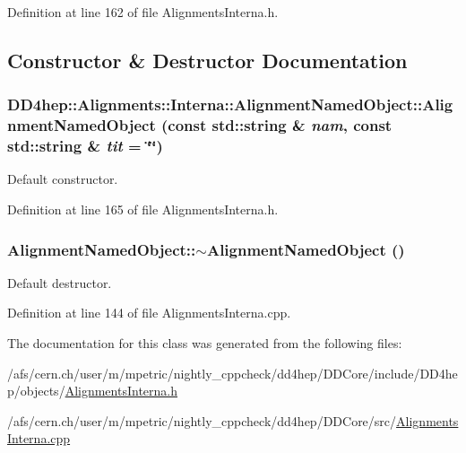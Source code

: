Definition at line 162 of file AlignmentsInterna.h.

\subsection{Constructor \& Destructor Documentation}
\hypertarget{class_d_d4hep_1_1_alignments_1_1_interna_1_1_alignment_named_object_a0446fa258b55e441adae43fd5f1c20e8}{
\subsubsection[{AlignmentNamedObject}]{\setlength{\rightskip}{0pt plus 5cm}DD4hep::Alignments::Interna::AlignmentNamedObject::AlignmentNamedObject (const std::string \& {\em nam}, \/  const std::string \& {\em tit} = {\ttfamily \char`\"{}\char`\"{}})}}
\label{class_d_d4hep_1_1_alignments_1_1_interna_1_1_alignment_named_object_a0446fa258b55e441adae43fd5f1c20e8}


Default constructor. 

Definition at line 165 of file AlignmentsInterna.h.\hypertarget{class_d_d4hep_1_1_alignments_1_1_interna_1_1_alignment_named_object_a96f03450aa9af33962d86b7067473939}{
\subsubsection[{$\sim$AlignmentNamedObject}]{\setlength{\rightskip}{0pt plus 5cm}AlignmentNamedObject::$\sim$AlignmentNamedObject ()}}
\label{class_d_d4hep_1_1_alignments_1_1_interna_1_1_alignment_named_object_a96f03450aa9af33962d86b7067473939}


Default destructor. 

Definition at line 144 of file AlignmentsInterna.cpp.

The documentation for this class was generated from the following files:\begin{DoxyCompactItemize}
\item 
/afs/cern.ch/user/m/mpetric/nightly\_\-cppcheck/dd4hep/DDCore/include/DD4hep/objects/\hyperlink{_alignments_interna_8h}{AlignmentsInterna.h}\item 
/afs/cern.ch/user/m/mpetric/nightly\_\-cppcheck/dd4hep/DDCore/src/\hyperlink{_alignments_interna_8cpp}{AlignmentsInterna.cpp}\end{DoxyCompactItemize}
